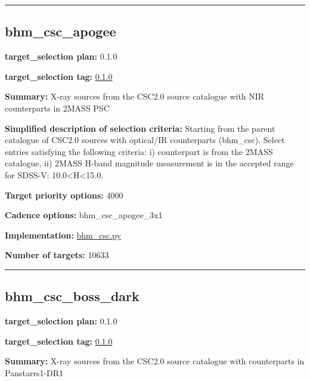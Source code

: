 \begin{center}\rule{0.5\linewidth}{0.5pt}\end{center}

\hypertarget{bhm_csc_apogee_plan0.1.0}{%
\subsection{bhm\_csc\_apogee}\label{bhm_csc_apogee_plan0.1.0}}

\noindent\textbf{target\_selection plan:} 0.1.0

\noindent\textbf{target\_selection tag:}
\href{https://github.com/sdss/target_selection/tree/0.1.0/}{0.1.0}

\noindent\textbf{Summary:} X-ray sources from the CSC2.0 source catalogue with
NIR counterparts in 2MASS PSC

\noindent\textbf{Simplified description of selection criteria:} Starting from the
parent catalogue of CSC2.0 sources with optical/IR counterparts
(bhm\_csc). Select entries satisfying the following criteria: i)
counterpart is from the 2MASS catalogue, ii) 2MASS H-band magnitude
measurement is in the accepted range for SDSS-V:
10.0\textless H\textless15.0.


\noindent\textbf{Target priority options:} 4000

\noindent\textbf{Cadence options:} bhm\_csc\_apogee\_3x1

\noindent\textbf{Implementation:}
\href{https://github.com/sdss/target_selection/blob/0.1.0/python/target_selection/cartons/bhm_csc.py}{bhm\_csc.py}

\noindent\textbf{Number of targets:} 10633

\begin{center}\rule{0.5\linewidth}{0.5pt}\end{center}

\hypertarget{bhm_csc_boss_dark_plan0.1.0}{%
\subsection{bhm\_csc\_boss\_dark}\label{bhm_csc_boss_dark_plan0.1.0}}

\noindent\textbf{target\_selection plan:} 0.1.0

\noindent\textbf{target\_selection tag:}
\href{https://github.com/sdss/target_selection/tree/0.1.0/}{0.1.0}

\noindent\textbf{Summary:} X-ray sources from the CSC2.0 source catalogue with
counterparts in Panstarrs1-DR1

